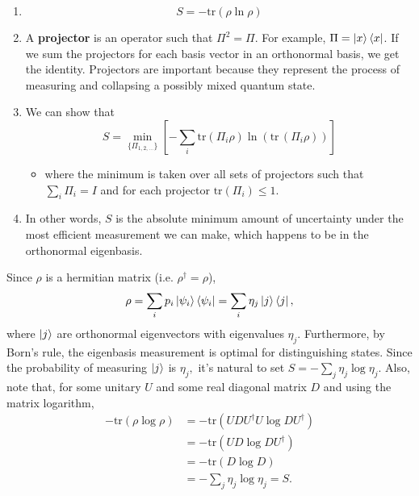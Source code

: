 \documentclass[12pt]{article}
\theoremstyle{remark}
\begin{document}
    \begin{enumerate}
        \item \[S = -\mathrm{tr}(\rho \ln \rho)\]
        \item A \textbf{projector} is an operator such that $\Pi^2 = \Pi$. For example, $\Pi= \ket{x}\bra{x}$. If we sum the projectors for each basis vector in an orthonormal basis, we get the identity. Projectors are important because they represent the process of measuring and collapsing a possibly mixed quantum state.
        \item We can show that \[S = \min_{\{\Pi_{1,2,\dots}\}} \left[ -\sum_i\mathrm{tr} (\Pi_i\rho) \ln(  \mathrm{tr}\,(\Pi_i \rho)) \right]\]
        \begin{itemize}
            \item where the minimum is taken over all sets of projectors such that $\sum_i \Pi_i = I$ and for each projector $\mathrm{tr}(\Pi_i)\le1$.
        \end{itemize} 
        \item In other words, $S$ is the absolute minimum amount of uncertainty under the most efficient measurement we can make, which happens to be in the orthonormal eigenbasis.
    \end{enumerate}


Since $\rho$ is a hermitian matrix (i.e. $\rho^\dagger=\rho$),
    \[\rho=\sum_i p_i\ket{\psi_i}\bra{\psi_i}=\sum_i\eta_j\ket{j}\bra{j},\]
where $\ket{j}$ are orthonormal eigenvectors with eigenvalues $\eta_j.$ Furthermore, by Born's rule, the eigenbasis measurement is optimal for distinguishing states. Since the probability of measuring $\ket{j}$ is $\eta_j,$ it's natural to set 
$S=-\sum_j\eta_j\log\eta_j.$ Also, note that, for some unitary $U$ and some real diagonal matrix $D$ and using the matrix logarithm,
\begin{align*}-\mathrm{tr}(\rho\log\rho)&=-\mathrm{tr}(UDU^\dagger U\log D U^\dagger)\\&=-\mathrm{tr}(UD\log D U^\dagger)\\&=-\mathrm{tr}(D\log D)\\&=-\sum_j \eta_j\log \eta_j=S.\end{align*}
\end{document}
